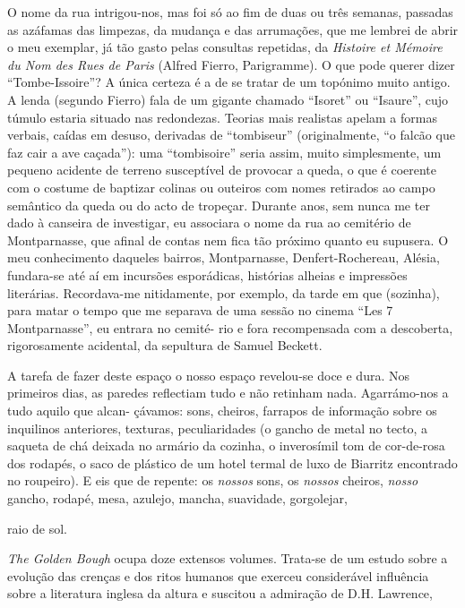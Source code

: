 O nome da rua intrigou-nos, mas foi só ao fim de duas ou três semanas,
passadas as azáfamas das limpezas, da mudança e das arrumações, que me
lembrei de abrir o meu exemplar, já tão gasto pelas consultas repetidas,
da \emph{Histoire et Mémoire du Nom des Rues de Paris }(Alfred Fierro,
Parigramme). O que pode querer dizer ``Tombe-Issoire''? A única certeza
é a de se tratar de um topónimo muito antigo. A lenda (segundo Fierro)
fala de um gigante chamado ``Isoret'' ou ``Isaure'', cujo túmulo estaria
situado nas redondezas. Teorias mais realistas apelam a formas
verbais, caídas em desuso, derivadas de ``tombiseur'' (originalmente,
``o falcão que faz cair a ave caçada''): uma ``tombisoire'' seria
assim, muito simplesmente, um pequeno acidente de terreno susceptível de
provocar a queda, o que é coerente com o costume de baptizar colinas ou
outeiros com nomes retirados ao campo semântico da queda ou do acto de
tropeçar. Durante anos, sem nunca me ter dado à canseira de investigar,
eu associara o nome da rua ao cemitério de Montparnasse, que afinal de
contas nem fica tão próximo quanto eu supusera. O meu conhecimento
daqueles bairros, Montparnasse, Denfert-Rochereau, Alésia, fundara-se
até aí em incursões esporádicas, histórias alheias e impressões literárias. Recordava-me nitidamente, por exemplo, da tarde em que
(sozinha), para matar o tempo que me separava de uma sessão no cinema
``Les 7 Montparnasse'', eu entrara no cemité- rio e fora recompensada
com a descoberta, rigorosamente acidental, da sepultura de Samuel
Beckett.

A tarefa de fazer deste espaço o nosso espaço revelou-se
doce e dura. Nos primeiros dias, as paredes reflectiam tudo e não
retinham nada. Agarrámo-nos a tudo aquilo que alcan- çávamos: sons,
cheiros, farrapos de informação sobre os inquilinos anteriores,
texturas, peculiaridades (o gancho de metal no tecto, a saqueta de chá
deixada no armário da cozinha, o inverosímil tom de cor-de-rosa dos
rodapés, o saco de plástico de um hotel termal de luxo de Biarritz
encontrado no roupeiro). E eis que de repente: os \emph{nossos }sons, os
\emph{nossos }cheiros, \emph{nosso }gancho, rodapé, mesa, azulejo,
mancha, suavidade, gorgolejar,

raio de sol.

\emph{The Golden Bough }ocupa doze extensos volumes. Trata-se de um
estudo sobre a evolução das crenças e dos ritos humanos que exerceu
considerável influência sobre a literatura inglesa da altura e suscitou
a admiração de D.H. Lawrence,

